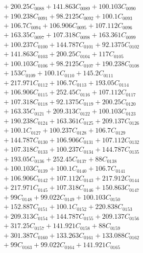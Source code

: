 \documentclass[a4paper,10pt]{article}
\begin{document}
{\begin{align}
&\quad  + 200.25C_{0088} + 141.863C_{0089} + 100.103C_{0090} \\[0.5ex]
&\quad  + 190.238C_{0091} + 98.2125C_{0092} + 100.1C_{0093} \\[0.5ex]
&\quad  + 106.7C_{0094} + 106.906C_{0095} + 107.112C_{0096} \\[0.5ex]
&\quad  + 163.35C_{0097} + 107.318C_{0098} + 163.361C_{0099} \\[0.5ex]
&\quad  + 100.237C_{0100} + 144.787C_{0101} + 92.1375C_{0102} \\[0.5ex]
&\quad  + 141.863C_{0103} + 200.25C_{0104} + 117C_{0105} \\[0.5ex]
&\quad  + 100.103C_{0106} + 98.2125C_{0107} + 190.238C_{0108} \\[0.5ex]
&\quad  + 153C_{0109} + 100.1C_{0110} + 145.2C_{0111} \\[0.5ex]
&\quad  + 217.971C_{0112} + 106.7C_{0113} + 193.05C_{0114} \\[0.5ex]
&\quad  + 106.906C_{0115} + 252.45C_{0116} + 107.112C_{0117} \\[0.5ex]
&\quad  + 107.318C_{0118} + 92.1375C_{0119} + 200.25C_{0120} \\[0.5ex]
&\quad  + 163.35C_{0121} + 209.313C_{0122} + 100.103C_{0123} \\[0.5ex]
&\quad  + 190.238C_{0124} + 163.361C_{0125} + 209.137C_{0126} \\[0.5ex]
&\quad  + 100.1C_{0127} + 100.237C_{0128} + 106.7C_{0129} \\[0.5ex]
&\quad  + 144.787C_{0130} + 106.906C_{0131} + 107.112C_{0132} \\[0.5ex]
&\quad  + 107.318C_{0133} + 100.237C_{0134} + 144.787C_{0135} \\[0.5ex]
&\quad  + 193.05C_{0136} + 252.45C_{0137} + 88C_{0138} \\[0.5ex]
&\quad  + 100.103C_{0139} + 100.1C_{0140} + 106.7C_{0141} \\[0.5ex]
&\quad  + 106.906C_{0142} + 107.112C_{0143} + 217.912C_{0144} \\[0.5ex]
&\quad  + 217.971C_{0145} + 107.318C_{0146} + 150.863C_{0147} \\[0.5ex]
&\quad  + 99C_{0148} + 99.022C_{0149} + 100.103C_{0150} \\[0.5ex]
&\quad  + 152.887C_{0151} + 100.1C_{0152} + 220.838C_{0153} \\[0.5ex]
&\quad  + 209.313C_{0154} + 144.787C_{0155} + 209.137C_{0156} \\[0.5ex]
&\quad  + 317.25C_{0157} + 141.921C_{0158} + 88C_{0159} \\[0.5ex]
&\quad  + 301.387C_{0160} + 133.263C_{0161} + 133.088C_{0162} \\[0.5ex]
&\quad  + 99C_{0163} + 99.022C_{0164} + 141.921C_{0165}\nonumber
\end{align}
}
\end{document}

